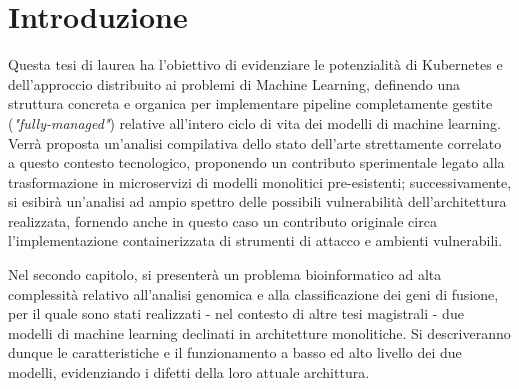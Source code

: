 % 
% 
% 



\clearpage
\cleardoublepage

\chapter{Introduzione}

Questa tesi di laurea ha l'obiettivo di evidenziare le potenzialità di Kubernetes e dell'approccio distribuito ai problemi di Machine Learning, definendo una struttura concreta e organica per implementare pipeline completamente gestite ({\em "fully-managed"}) relative all'intero ciclo di vita dei modelli di machine learning. Verrà proposta un'analisi compilativa dello stato dell'arte strettamente correlato a questo contesto tecnologico, proponendo un contributo sperimentale legato alla trasformazione in microservizi di modelli monolitici pre-esistenti; successivamente, si esibirà un'analisi ad ampio spettro delle possibili vulnerabilità dell'architettura realizzata, fornendo anche in questo caso un contributo originale circa l'implementazione containerizzata di strumenti di attacco e ambienti vulnerabili.

Nel secondo capitolo, si presenterà un problema bioinformatico ad alta complessità relativo all'analisi genomica e alla classificazione dei geni di fusione, per il quale sono stati realizzati - nel contesto di altre tesi magistrali - due modelli di machine learning declinati in architetture monolitiche. Si descriveranno dunque le caratteristiche e il funzionamento a basso ed alto livello dei due modelli, evidenziando i difetti della loro attuale archittura.

